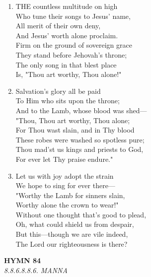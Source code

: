 \begin{enumerate}
    \item THE countless multitude on high \\
        Who tune their songs to Jesus' name, \\
        All merit of their own deny, \\
        And Jesus' worth alone proclaim. \\
        Firm on the ground of sovereign grace \\
        They stand before Jehovah's throne; \\
        The only song in that blest place \\
        Is, "Thou art worthy, Thou alone!"

    \item Salvation's glory all be paid \\
        To Him who sits upon the throne; \\
        And to the Lamb, whose blood was shed--- \\
        "Thou, Thou art worthy, Thou alone; \\
        For Thou wast slain, and in Thy blood \\
        These robes were washed so spotless pure; \\
        Thou mad'st us kings and priests to God, \\
        For ever let Thy praise endure."

    \item Let us with joy adopt the strain \\
        We hope to sing for ever there--- \\
        "Worthy the Lamb for sinners slain, \\
        Worthy alone the crown to wear!" \\
        Without one thought that's good to plead, \\
        Oh, what could shield us from despair, \\
        But this---though we are vile indeed, \\
        The Lord our righteousness is there?

\end{enumerate}

\newpage
\begin{center}
    {\Large \textbf{HYMN 84}}
    \\
    \textit{8.8.6.8.8.6. MANNA}
\end{center}
\vspace{1em}

